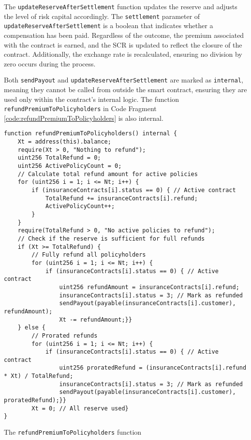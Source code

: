 \documentclass[10pt]{article}
\begin{document}
The \texttt{updateReserveAfterSettlement} function updates the reserve and adjusts the level of risk capital accordingly. The \texttt{settlement} parameter of \texttt{updateReserveAfterSettlement} is a boolean that indicates whether a compensation has been paid. Regardless of the outcome, the premium associated with the contract is earned, and the SCR is updated to reflect the closure of the contract. Additionally, the exchange rate is recalculated, ensuring no division by zero occurs during the process.

Both \texttt{sendPayout} and \texttt{updateReserveAfterSettlement} are marked as \texttt{internal}, meaning they cannot be called from outside the smart contract, ensuring they are used only within the contract’s internal logic. The function \texttt{refundPremiumToPolicyholders} in Code Fragment \ref{code:refundPremiumToPolicyholders} is also internal.

\begin{codefragment}[!ht]
\begin{lstlisting}[language=Solidity]
function refundPremiumToPolicyholders() internal {
    Xt = address(this).balance;
    require(Xt > 0, "Nothing to refund");
    uint256 TotalRefund = 0;
    uint256 ActivePolicyCount = 0;
    // Calculate total refund amount for active policies
    for (uint256 i = 1; i <= Nt; i++) {
        if (insuranceContracts[i].status == 0) { // Active contract
            TotalRefund += insuranceContracts[i].refund;
            ActivePolicyCount++;
        }
    }
    require(TotalRefund > 0, "No active policies to refund");
    // Check if the reserve is sufficient for full refunds
    if (Xt >= TotalRefund) {
        // Fully refund all policyholders
        for (uint256 i = 1; i <= Nt; i++) {
            if (insuranceContracts[i].status == 0) { // Active contract
                uint256 refundAmount = insuranceContracts[i].refund;
                insuranceContracts[i].status = 3; // Mark as refunded
                sendPayout(payable(insuranceContracts[i].customer), refundAmount);
                Xt -= refundAmount;}}
    } else {
        // Prorated refunds
        for (uint256 i = 1; i <= Nt; i++) {
            if (insuranceContracts[i].status == 0) { // Active contract
                uint256 proratedRefund = (insuranceContracts[i].refund * Xt) / TotalRefund;
                insuranceContracts[i].status = 3; // Mark as refunded
                sendPayout(payable(insuranceContracts[i].customer), proratedRefund);}}
        Xt = 0; // All reserve used}
}

\end{lstlisting}
    \caption{The \texttt{refundPremiumToPolicyholders} function}
    \label{code:refundPremiumToPolicyholders}
\end{codefragment}
\end{document}
